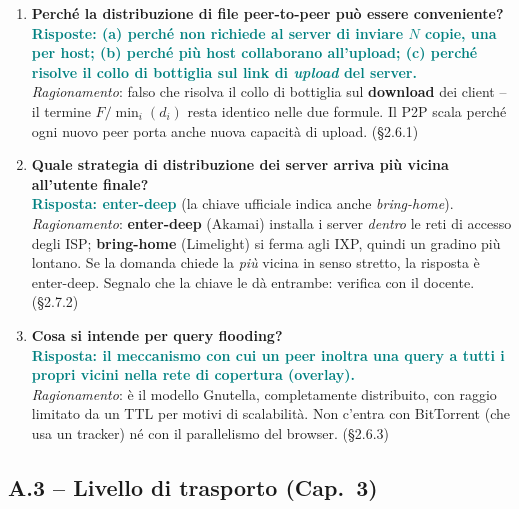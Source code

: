 \documentclass[12pt, a4paper]{article}
\begin{document}
\begin{enumerate}[leftmargin=*, resume]
\item \textbf{Perché la distribuzione di file peer-to-peer può essere conveniente?}\\
\textcolor{teal}{\textbf{Risposte: (a) perché non richiede al server di inviare $N$ copie, una per host; (b) perché più host collaborano all'upload; (c) perché risolve il collo di bottiglia sul link di \emph{upload} del server.}}\\
\textit{Ragionamento}: \textcolor{red!70!black}{falso} che risolva il collo di bottiglia sul \textbf{download} dei client -- il termine $F/\min_i(d_i)$ resta identico nelle due formule. Il P2P scala perché ogni nuovo peer porta anche nuova capacità di upload. (\S2.6.1)

\item \textbf{Quale strategia di distribuzione dei server arriva più vicina all'utente finale?}\\
\textcolor{teal}{\textbf{Risposta: enter-deep}} (la chiave ufficiale indica anche \emph{bring-home}).\\
\textit{Ragionamento}: \textbf{enter-deep} (Akamai) installa i server \emph{dentro} le reti di accesso degli ISP; \textbf{bring-home} (Limelight) si ferma agli IXP, quindi un gradino più lontano. Se la domanda chiede la \emph{più} vicina in senso stretto, la risposta è enter-deep. \textcolor{red!70!black}{Segnalo che la chiave le dà entrambe: verifica con il docente.} (\S2.7.2)

\item \textbf{Cosa si intende per query flooding?}\\
\textcolor{teal}{\textbf{Risposta: il meccanismo con cui un peer inoltra una query a tutti i propri vicini nella rete di copertura (overlay).}}\\
\textit{Ragionamento}: è il modello Gnutella, completamente distribuito, con raggio limitato da un TTL per motivi di scalabilità. Non c'entra con BitTorrent (che usa un tracker) né con il parallelismo del browser. (\S2.6.3)

\end{enumerate}

\subsection*{A.3 -- Livello di trasporto (Cap.\ 3)}
\end{document}

